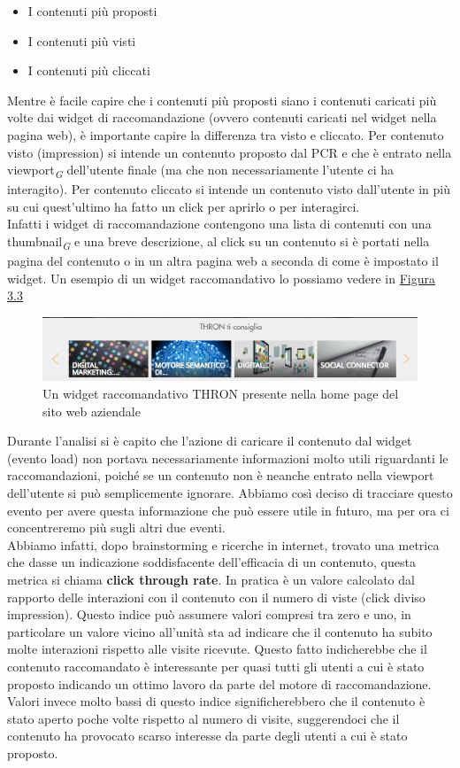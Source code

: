 \documentclass[a4paper, 12pt, twoside, openright]{book}
\newcommand{\gloss}[1]{#1\textsubscript{\textit{\tiny{G}}}}
\begin{document}
\begin{itemize}
\item I contenuti più proposti
\item I contenuti più visti
\item I contenuti più cliccati
\end{itemize}
Mentre è facile capire che i contenuti più proposti siano i contenuti caricati più volte dai widget di raccomandazione (ovvero contenuti caricati nel widget nella pagina web), è importante capire la differenza tra visto e cliccato. Per contenuto visto (impression) si intende un contenuto proposto dal PCR e che è entrato nella \gloss{viewport} dell'utente finale (ma che non necessariamente l'utente ci ha interagito). Per contenuto cliccato si intende un contenuto visto dall'utente in più su cui quest'ultimo ha fatto un click per aprirlo o per interagirci.\\
Infatti i widget di raccomandazione contengono una lista di contenuti con una \gloss{thumbnail} e una breve descrizione, al click su un contenuto si è portati nella pagina del contenuto o in un altra pagina web a seconda di come è impostato il widget. Un esempio di un widget raccomandativo lo possiamo vedere in \hyperref[pcr-example]{Figura 3.3}
\begin{figure}[H]
	\centering
	\label{pcr-example}
	\includegraphics[width=1.0\textwidth]{images/pcr-example.jpg}
	\caption{Un widget raccomandativo THRON presente nella home page del sito web aziendale}
\end{figure} 
Durante l'analisi si è capito che l'azione di caricare il contenuto dal widget (evento load) non portava necessariamente informazioni molto utili riguardanti le raccomandazioni, poiché se un contenuto non è neanche entrato nella viewport dell'utente si può semplicemente ignorare. Abbiamo così deciso di tracciare questo evento per avere questa informazione che può essere utile in futuro, ma per ora ci concentreremo più sugli altri due eventi.\\
Abbiamo infatti, dopo brainstorming e ricerche in internet, trovato una metrica che dasse un indicazione soddisfacente dell'efficacia di un contenuto, questa metrica si chiama \textbf{click through rate}. In pratica è un valore calcolato dal rapporto delle interazioni con il contenuto con il numero di viste (click diviso impression). Questo indice può assumere valori compresi tra zero e uno, in particolare un valore vicino all'unità sta ad indicare che il contenuto ha subito molte interazioni rispetto alle visite ricevute. Questo fatto indicherebbe che il contenuto raccomandato è interessante per quasi tutti gli utenti a cui è stato proposto indicando un ottimo lavoro da parte del motore di raccomandazione. Valori invece molto bassi di questo indice significherebbero che il contenuto è stato aperto poche volte rispetto al numero di visite, suggerendoci che il contenuto ha provocato scarso interesse da parte degli utenti a cui è stato proposto.\\
\end{document}
